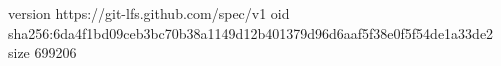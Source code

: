 version https://git-lfs.github.com/spec/v1
oid sha256:6da4f1bd09ceb3bc70b38a1149d12b401379d96d6aaf5f38e0f5f54de1a33de2
size 699206
